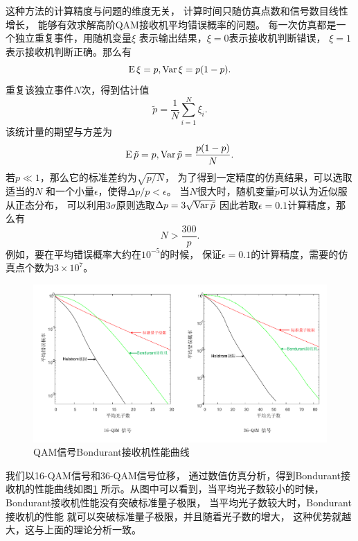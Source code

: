 这种方法的计算精度与问题的维度无关\cite{mcbook}，
计算时间只随仿真点数和信号数目线性增长，
能够有效求解高阶QAM接收机平均错误概率的问题。
每一次仿真都是一个独立重复事件，用随机变量$\xi$
表示输出结果，$\xi=0$表示接收机判断错误，
$\xi=1$表示接收机判断正确。那么有
\begin{equation}
\operatorname{E} \xi = p, \operatorname{Var} \xi = p(1-p).
\end{equation}
重复该独立事件$N$次，得到估计值
\begin{equation}
\tilde{p} = \frac{1}{N} \sum_{i=1}^N \xi_i.
\end{equation}
该统计量的期望与方差为
\begin{equation}
\operatorname{E} \tilde{p} = p, \operatorname{Var} \tilde{p} = \frac{p(1-p)}{N}.
\end{equation}
若$p \ll 1$，那么它的标准差约为$\sqrt{p/N}$，
为了得到一定精度的仿真结果，可以选取适当的$N$
和一个小量$\epsilon$，使得$\Delta p / p < \epsilon$。
当$N$很大时，随机变量$\tilde{p}$可以认为近似服从正态分布，
可以利用$3\sigma$原则选取$\Delta p = 3 \sqrt{\operatorname{Var} \tilde{p}}$
因此若取$\epsilon=0.1$计算精度，那么有
\begin{equation}
N > \frac{300}{p}.
\end{equation}
例如，要在平均错误概率大约在$10^{-5}$的时候，
保证$\epsilon=0.1$的计算精度，需要的仿真点个数为$3\times10^7$。

\begin{figure}
\centering
  \includegraphics[width=\textwidth]{figures/chap3/QAM-bondurant-error}
  \caption{QAM信号Bondurant接收机性能曲线}
  \label{fig:QAM-bondurant-error}
\end{figure}


我们以16-QAM信号和36-QAM信号位移，
通过数值仿真分析，得到Bondurant接收机的性能曲线如图\ref{fig:QAM-bondurant-error}
所示。从图中可以看到，当平均光子数较小的时候，
Bondurant接收机性能没有突破标准量子极限，
当平均光子数较大时，Bondurant接收机的性能
就可以突破标准量子极限，并且随着光子数的增大，
这种优势就越大，这与上面的理论分析一致。




